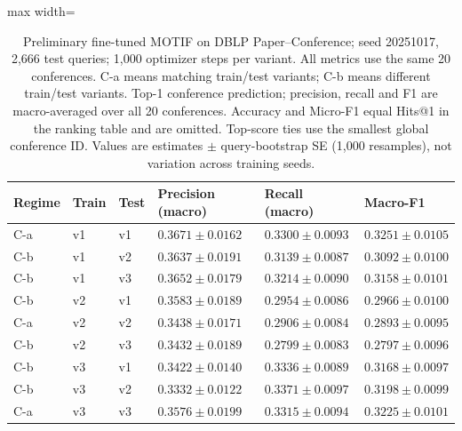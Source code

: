 \begin{table}[htbp]
\centering
\small
\renewcommand{\arraystretch}{1.15}
\setlength{\tabcolsep}{5pt}
\begin{adjustbox}{max width=\linewidth}
\begin{tabular}{|l|l|l|l|l|l|}
\hline
\textbf{Regime} & \textbf{Train} & \textbf{Test} & \textbf{Precision (macro)} & \textbf{Recall (macro)} & \textbf{Macro-F1} \\
\hline
C-a & v1 & v1 & $0.3671 \pm 0.0162$ & $0.3300 \pm 0.0093$ & $0.3251 \pm 0.0105$ \\
\hline
C-b & v1 & v2 & $0.3637 \pm 0.0191$ & $0.3139 \pm 0.0087$ & $0.3092 \pm 0.0100$ \\
\hline
C-b & v1 & v3 & $0.3652 \pm 0.0179$ & $0.3214 \pm 0.0090$ & $0.3158 \pm 0.0101$ \\
\hline
C-b & v2 & v1 & $0.3583 \pm 0.0189$ & $0.2954 \pm 0.0086$ & $0.2966 \pm 0.0100$ \\
\hline
C-a & v2 & v2 & $0.3438 \pm 0.0171$ & $0.2906 \pm 0.0084$ & $0.2893 \pm 0.0095$ \\
\hline
C-b & v2 & v3 & $0.3432 \pm 0.0189$ & $0.2799 \pm 0.0083$ & $0.2797 \pm 0.0096$ \\
\hline
C-b & v3 & v1 & $0.3422 \pm 0.0140$ & $0.3336 \pm 0.0089$ & $0.3168 \pm 0.0097$ \\
\hline
C-b & v3 & v2 & $0.3332 \pm 0.0122$ & $0.3371 \pm 0.0097$ & $0.3198 \pm 0.0099$ \\
\hline
C-a & v3 & v3 & $0.3576 \pm 0.0199$ & $0.3315 \pm 0.0094$ & $0.3225 \pm 0.0101$ \\
\hline
\end{tabular}
\end{adjustbox}
\caption{Preliminary fine-tuned MOTIF on DBLP Paper--Conference; seed 20251017, 2,666 test queries; 1,000 optimizer steps per variant. All metrics use the same 20 conferences. C-a means matching train/test variants; C-b means different train/test variants. Top-1 conference prediction; precision, recall and F1 are macro-averaged over all 20 conferences. Accuracy and Micro-F1 equal Hits@1 in the ranking table and are omitted. Top-score ties use the smallest global conference ID. Values are estimates $\pm$ query-bootstrap SE (1,000 resamples), not variation across training seeds.}
\label{tab:motif-dblp-matrix-conference-prediction}
\end{table}
